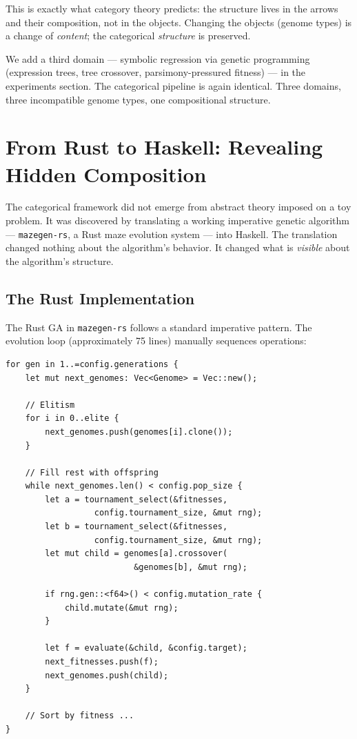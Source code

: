 \documentclass[10pt]{article}
\begin{document}
This is exactly what category theory predicts: the structure lives in the arrows and their composition, not in the objects. Changing the objects (genome types) is a change of \emph{content}; the categorical \emph{structure} is preserved.

We add a third domain --- symbolic regression via genetic programming (expression trees, tree crossover, parsimony-pressured fitness) --- in the experiments section. The categorical pipeline is again identical. Three domains, three incompatible genome types, one compositional structure.

\section{From Rust to Haskell: Revealing Hidden Composition}

The categorical framework did not emerge from abstract theory imposed on a toy problem. It was discovered by translating a working imperative genetic algorithm --- \texttt{mazegen-rs}, a Rust maze evolution system --- into Haskell. The translation changed nothing about the algorithm's behavior. It changed what is \emph{visible} about the algorithm's structure.

\subsection{The Rust Implementation}

The Rust GA in \texttt{mazegen-rs} follows a standard imperative pattern. The evolution loop (approximately 75 lines) manually sequences operations:

\begin{lstlisting}[style=ruststyle]
for gen in 1..=config.generations {
    let mut next_genomes: Vec<Genome> = Vec::new();

    // Elitism
    for i in 0..elite {
        next_genomes.push(genomes[i].clone());
    }

    // Fill rest with offspring
    while next_genomes.len() < config.pop_size {
        let a = tournament_select(&fitnesses,
                  config.tournament_size, &mut rng);
        let b = tournament_select(&fitnesses,
                  config.tournament_size, &mut rng);
        let mut child = genomes[a].crossover(
                          &genomes[b], &mut rng);

        if rng.gen::<f64>() < config.mutation_rate {
            child.mutate(&mut rng);
        }

        let f = evaluate(&child, &config.target);
        next_fitnesses.push(f);
        next_genomes.push(child);
    }

    // Sort by fitness ...
}
\end{lstlisting}
\end{document}
